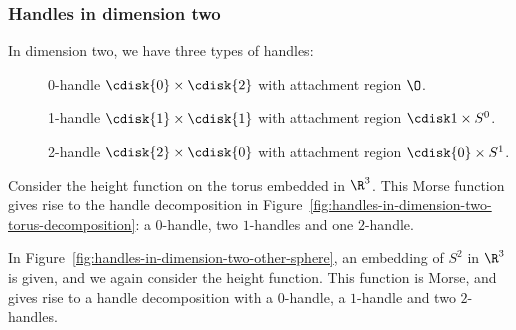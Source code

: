 \subsubsection*{Handles in dimension two}
In dimension two, we have three types of handles:
\begin{description}
    \item[] 0-handle  $\cdisk{0} \times \cdisk{2}$ with attachment region $\O$.
    \item[] 1-handle  $\cdisk{1} \times \cdisk{1}$ with attachment region $\cdisk1 \times S^{0}$.
    \item[] 2-handle  $\cdisk{2} \times \cdisk{0}$ with attachment region $\cdisk{0} \times S^1$.
    \end{description}
\begin{marginfigure}
    \centering
    \caption{The standard embedding of the torus in $\R^3$ gives rise to a handle decomposition consisting of a 0-handle, two 1-handles and one 2-handle.}
    \label{fig:handles-in-dimension-two-torus-decomposition}
\end{marginfigure}
\begin{eg}
    Consider the height function on the torus embedded in $\R^3$. This Morse function gives rise to the handle decomposition in Figure~\ref{fig:handles-in-dimension-two-torus-decomposition}: a $0$-handle, two $1$-handles and one $2$-handle.
\end{eg}

\begin{eg}
    In Figure~\ref{fig:handles-in-dimension-two-other-sphere}, an embedding of $S^2$ in $\R^3$ is given, and we again consider the height function.
    This function is Morse, and gives rise to a handle decomposition with a $0$-handle, a $1$-handle and two $2$-handles.
\end{eg}
\begin{marginfigure}
    \centering
    \caption{Embedding $S^2$ in $ \R^3$ in an unusual way gives rise to a handle decomposition with one 0-handle, one 1-handle and two 2-handles. }
    \label{fig:handles-in-dimension-two-other-sphere}
\end{marginfigure}
\begin{marginfigure}
    \centering
    \caption{Top: $ S^1 \times S^{2}$ can be decomposed using a 0-handle, 1-handle, 2-handle and 3-handle.
        Bottom: same handle decomposition, but drawn differently to show that  a 0-handle and a 1-handle are diffeomorphic to $S^{2} \times [0,1]$.
}
    \label{fig:handles-in-dimension-three-s1-x-s2}
\end{marginfigure}

